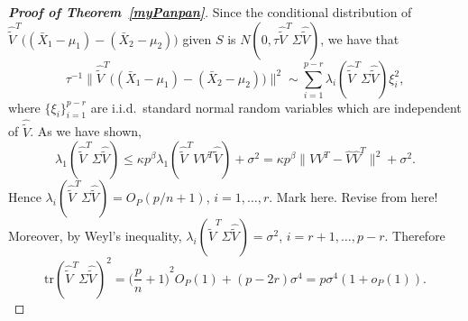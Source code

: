\documentclass[review]{elsarticle}
\theoremstyle{plain}
\theoremstyle{definition}
\theoremstyle{remark}
\begin{document}
\begin{proof}[\textbf{Proof of Theorem~\ref{myPanpan}}]
    Since the conditional distribution of
    $\hat{\tilde{V}}^T\big((\bar{X}_1-\mu_1)-(\bar{X}_2-\mu_2)\big)$ given $S$ is $N(0,\tau \hat{\tilde{V}}^T\Sigma\hat{\tilde{V}})$,
    we have that
$$\tau^{-1}\big\|\hat{\tilde{V}}^T\big((\bar{X}_1-\mu_1)-(\bar{X}_2-\mu_2)\big)\big\|^2
\sim
    \sum_{i=1}^{p-r} \lambda_i(\hat{\tilde{V}}^T\Sigma\hat{\tilde{V}})\xi_i^2,
    $$
where $\{\xi_i\}_{i=1}^{p-r}$ are i.i.d.\  standard normal random variables which are independent of $\hat{\tilde{V}}$.
    As we have shown,
    $$
     \lambda_1(\hat{\tilde{V}}^T\Sigma\hat{\tilde{V}})\leq 
     \kappa p^{\beta}\lambda_1(\hat{\tilde{V}}^T V V^T\hat{\tilde{V}})+\sigma^2
     =
    \kappa p^\beta \|VV^T -\hat{V}\hat{V}^T\|^2+\sigma^2.
    $$
    Hence $\lambda_i(\hat{\tilde{V}}^T\Sigma\hat{\tilde{V}})=O_P({p}/{n}+1)$, $i=1,\ldots,r$.
    {\color{red}Mark here. Revise from here!}
    Moreover, by Weyl's inequality,
    $
    \lambda_i(\hat{\tilde{V}}^T\Sigma\hat{\tilde{V}})=\sigma^2
    $, $i=r+1,\ldots,p-r$.
    Therefore
\begin{equation}\label{traceA1}
\mathrm{tr}(\hat{\tilde{V}}^T\Sigma\hat{\tilde{V}})^2=
    {\big(\frac{p}{n}+1\big)}^2O_P(1)
    +
    (p-2r)\sigma^4
    =p\sigma^4(1+o_P(1)).
\end{equation}


\end{proof}
\end{document}
